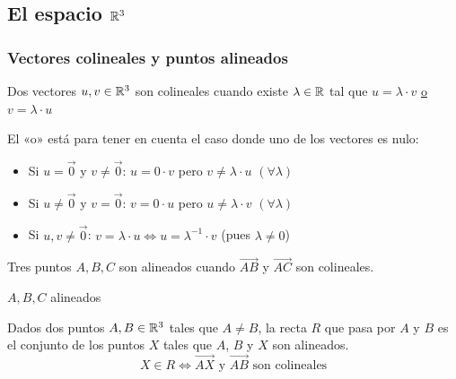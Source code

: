 \documentclass[11pt,a4paper]{article}
\begin{document}

\subsection{\texorpdfstring{El espacio $\mathbb{R}^3$}{El espacio R3}}

\subsubsection*{Vectores colineales y puntos alineados}

\begin{definicion}
Dos vectores $u,v\in\mathbb{R}^3$ son colineales cuando existe $\lambda\in\mathbb{R}$ tal que $u=\lambda\cdot v$ \underline{o} $v=\lambda\cdot u$
\end{definicion}

\begin{observacion}
El «o» está para tener en cuenta el caso donde uno de los vectores es nulo:
\begin{itemize}
  \item Si $u=\vec0$ y $v\neq\vec0$: \quad $u=0\cdot v$ \quad pero \quad $v\neq\lambda\cdot u$ \quad $(\forall\lambda)$
  \item Si $u\neq\vec0$ y $v=\vec0$: \quad $v=0\cdot u$ \quad pero \quad $u\neq\lambda\cdot v$ \quad $(\forall\lambda)$
  \item Si $u,v\neq\vec0$: \quad $v=\lambda\cdot u\iff u=\lambda^{-1}\cdot v$ \quad (pues $\lambda\neq0$)
\end{itemize}
\end{observacion}

\begin{definicion}
Tres puntos $A,B,C$ son alineados cuando $\overrightarrow{AB}$ y $\overrightarrow{AC}$ son colineales.
\end{definicion}

\begin{observacion}
$A,B,C$ alineados
\end{observacion}

\begin{definicion}
Dados dos puntos $A,B\in\mathbb{R}^3$ tales que $A\neq B$, la recta $R$ que pasa por $A$ y $B$ es el conjunto de los puntos $X$ tales que $A$, $B$ y $X$ son alineados.
\[
X\in R\iff\overrightarrow{AX}\text{ y }\overrightarrow{AB}\text{ son colineales}
\]
\end{definicion}
\end{document}
